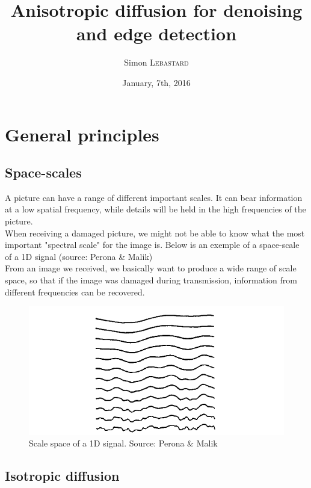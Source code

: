 \documentclass[12pt,a4paper]{article}
\begin{document}
	
	
	\title{Anisotropic diffusion for denoising and edge detection}
	\author{Simon \textsc{Lebastard}}
	\date{January, 7th, 2016}
	
\maketitle
	
\section{General principles}

\subsection{Space-scales}
A picture can have a range of different important scales. It can bear information at a low spatial frequency, while details will be held in the high frequencies of the picture.\\
When receiving a damaged picture, we might not be able to know what the most important "spectral scale" for the image is. Below is an exemple of a space-scale of a 1D signal (source: Perona \& Malik)
\\
From an image we received, we basically want to produce a wide range of scale space, so that if the image was damaged during transmission, information from different frequencies can be recovered.
\\
\begin{figure}[h]
	\centering
	\includegraphics[scale=0.3]{ScaleSpace_Example.png}
	\caption{Scale space of a 1D signal. Source: Perona \& Malik}
\end{figure}

\subsection{Isotropic diffusion}
\end{document}
